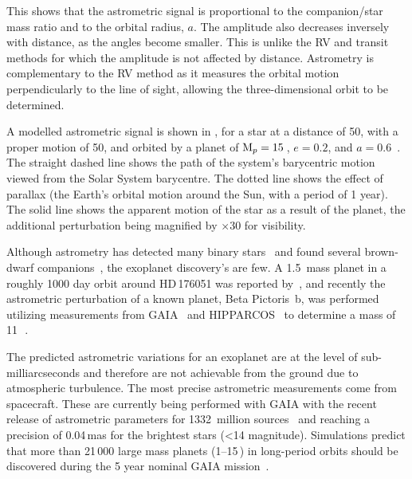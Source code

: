 This shows that the astrometric signal is proportional to the companion/star mass ratio and to the orbital radius, $a$.
The amplitude also decreases inversely with distance, as the angles become smaller.
This is unlike the {RV} and transit methods for which the amplitude is not affected by distance.
Astrometry is complementary to the {RV} method as it measures the orbital motion perpendicularly to the line of sight, allowing the three-dimensional orbit to be determined.

A modelled astrometric signal is shown in , for a star at a distance of 50\pc, with a proper motion of 50\masperyr{}, and orbited by a planet of $\textrm{M}_{p} = 15$\,\Mjup{}, $e = 0.2$, and $a = 0.6$\AU~\citep{perryman_extrasolar_2000}.
The straight dashed line shows the path of the system's barycentric motion viewed from the Solar System barycentre.
The dotted line shows the effect of parallax (the Earth's orbital motion around the Sun, with a period of 1 year).
The solid line shows the apparent motion of the star as a result of the planet, the additional perturbation being magnified by $\times 30$ for visibility.

Although astrometry has detected many binary stars~\citep[e.g.][]{gontcharov_new_2000} and found several brown-dwarf companions~\citep[e.g.][]{sahlmann_search_2011}, the exoplanet discovery's are few.
A 1.5\,\Mjup{} mass planet in a roughly 1000 day orbit around {HD\,176051} was reported by~\citet{muterspaugh_phases_2010}, and recently the astrometric perturbation of a known planet, {Beta Pictoris~b}, was performed utilizing measurements from {GAIA}~\citep{gaiacollaboration_gaia_2016} and {HIPPARCOS}~\citep{esa_hipparcos_1997} to determine a mass of 11\,\Mjup~\citep{snellen_mass_2018}.

The predicted astrometric variations for an exoplanet are at the level of sub-milliarcseconds and therefore are not achievable from the ground due to atmospheric turbulence.
The most precise astrometric measurements come from spacecraft.
These are currently being performed with GAIA with the recent release of astrometric parameters for 1332~million sources~\citep{collaboration_gaia_2018} and reaching a precision of 0.04\,mas for the brightest stars (<14 magnitude).
Simulations predict that more than 21\,000 large mass planets (1--15\,\Mjup) in long-period orbits should be discovered during the 5 year nominal GAIA mission~\citep{perryman_astrometric_2014}.

